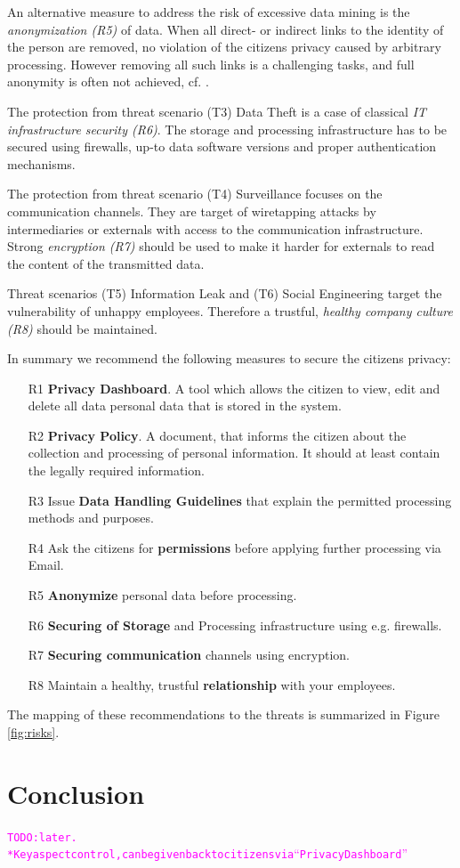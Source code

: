 \documentclass[runningheads,a4paper]{llncs}
\newcommand{\TODO}[1]{\begin{alltt}\textcolor{magenta}{TODO: #1}\end{alltt}}
\begin{document}
An alternative measure to address the risk of excessive data mining is
the \emph{anonymization (R5)} of data. When all direct- or indirect
links to the identity of the person are removed, no violation of the
citizens privacy caused by arbitrary processing. However removing all
such links is a challenging tasks, and full anonymity is often not
achieved, cf. \cite{krumm2009}.

The protection from threat scenario (T3) Data Theft is a case of
classical \emph{IT infrastructure security (R6)}. The storage and processing infrastructure has
to be secured using firewalls, up-to data software versions and proper
authentication mechanisms.

The protection from threat scenario (T4) Surveillance focuses on the
communication channels. They are target of wiretapping attacks by
intermediaries or externals with access to the communication
infrastructure. Strong \emph{encryption (R7)} should be used to make
it harder for externals to read the content of the transmitted data.

Threat scenarios (T5) Information Leak and (T6) Social Engineering
target the vulnerability of unhappy employees. Therefore a trustful,
\emph{healthy company culture (R8)} should be maintained.

In summary we recommend the following measures to secure the citizens
privacy:
\begin{enumerate}
\item[R1] \textbf{Privacy Dashboard}. A tool which allows the citizen to view, edit
  and delete all data personal data that is stored in the system.
\item[R2] \textbf{Privacy Policy}. A document, that informs the citizen about the
  collection and processing of personal information. It should at
  least contain the legally required information.
\item[R3] Issue \textbf{Data Handling Guidelines} that explain the permitted
  processing methods and purposes.
\item[R4] Ask the citizens for \textbf{permissions} before applying further
  processing via Email.
\item[R5] \textbf{Anonymize} personal data before processing.
\item[R6] \textbf{Securing of Storage} and Processing infrastructure using e.g. firewalls.
\item[R7] \textbf{Securing communication} channels using encryption.
\item[R8] Maintain a healthy, trustful \textbf{relationship} with your employees.
\end{enumerate}
The mapping of these recommendations to the threats is summarized in Figure \ref{fig:risks}.




\section{Conclusion}

\TODO{later.\\
* Key aspect control, can be given back to citizens via ``Privacy Dashboard''
}


{}
\end{document}
